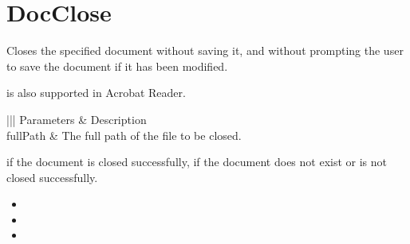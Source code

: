 \documentclass[letterpaper,12pt,english,openany,oneside]{sphinxmanual}
\begin{document}
\section{DocClose}
\label{\detokenize{IAC_API_DDE_Messages:id18}}
Closes the specified document without saving it, and without prompting the user to save the document if it has been modified.

 is also supported in Acrobat Reader.


\begin{sphinxVerbatim}[commandchars=\\\{\}]
\PYG{p}{[} \PYG{p}{]}
\end{sphinxVerbatim}



\begin{savenotes}\sphinxattablestart
\centering
\begin{tabular}[t]{|||}
\hline
\sphinxstyletheadfamily 
Parameters
&\sphinxstyletheadfamily 
Description
\\
\hline
fullPath
&
The full path of the file to be closed.
\\
\hline
\end{tabular}
\par
\sphinxattableend\end{savenotes}


 if the document is closed successfully,  if the document does not exist or is not closed successfully.

\label{\detokenize{IAC_API_DDE_Messages:related-methods-4}}
\begin{itemize}
\item {} 

\item {} 

\item {} 

\end{itemize}
\end{document}

